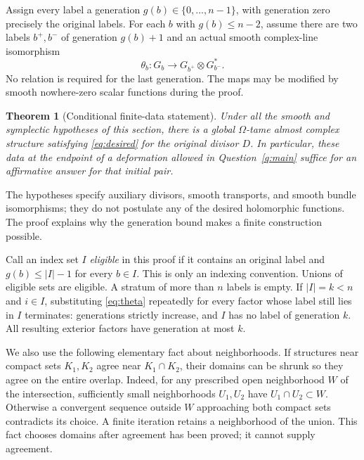 \documentclass[11pt]{article}
\newtheorem{theorem}{Theorem}[section]
\theoremstyle{definition}
\theoremstyle{remark}
\begin{document}
Assign every label a generation $g(b)\in\{0,\ldots,n-1\}$, with generation zero precisely the original labels. For each $b$ with $g(b)\leq n-2$, assume there are two labels $b^+,b^-$ of generation $g(b)+1$ and an actual smooth complex-line isomorphism
\begin{equation}\label{eq:theta}
 \theta_b:G_b\longrightarrow G_{b^+}\otimes G_{b^-}^*.
\end{equation}
No relation is required for the last generation. The maps may be modified by smooth nowhere-zero scalar functions during the proof.

\begin{theorem}[Conditional finite-data statement]\label{thm:conditional}
Under all the smooth and symplectic hypotheses of this section, there is a global $\Omega$-tame almost complex structure satisfying \eqref{eq:desired} for the original divisor $D$. In particular, these data at the endpoint of a deformation allowed in Question~\ref{q:main} suffice for an affirmative answer for that initial pair.
\end{theorem}
The hypotheses specify auxiliary divisors, smooth transports, and smooth bundle isomorphisms; they do not postulate any of the desired holomorphic functions. The proof explains why the generation bound makes a finite construction possible.

Call an index set $I$ \emph{eligible} in this proof if it contains an original label and $g(b)\leq |I|-1$ for every $b\in I$. This is only an indexing convention. Unions of eligible sets are eligible. A stratum of more than $n$ labels is empty. If $|I|=k<n$ and $i\in I$, substituting \eqref{eq:theta} repeatedly for every factor whose label still lies in $I$ terminates: generations strictly increase, and $I$ has no label of generation $k$. All resulting exterior factors have generation at most $k$.

We also use the following elementary fact about neighborhoods. If structures near compact sets $K_1,K_2$ agree near $K_1\cap K_2$, their domains can be shrunk so they agree on the entire overlap. Indeed, for any prescribed open neighborhood $W$ of the intersection, sufficiently small neighborhoods $U_1,U_2$ have $U_1\cap U_2\subset W$. Otherwise a convergent sequence outside $W$ approaching both compact sets contradicts its choice. A finite iteration retains a neighborhood of the union. This fact chooses domains after agreement has been proved; it cannot supply agreement.
\end{document}

